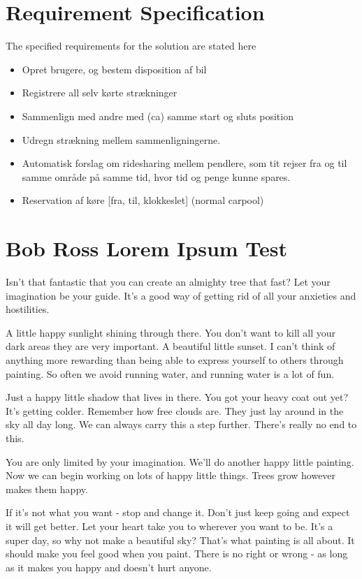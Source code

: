 \section{Requirement Specification}

The specified requirements for the solution are stated here
\begin{itemize}
	\item Opret brugere, og bestem disposition af bil
	\item Registrere all selv kørte strækninger
	\item Sammenlign med andre med (ca) samme start og sluts position
	\item Udregn strækning mellem sammenligningerne. 
	\item Automatisk forslag om ridesharing mellem pendlere, som tit rejser fra og til samme område på samme tid, hvor tid og penge kunne spares.
	\item Reservation af køre [fra, til, klokkeslet] (normal carpool)
\end{itemize}

\section{Bob Ross Lorem Ipsum Test}
Isn't that fantastic that you can create an almighty tree that fast? Let your imagination be your guide. It's a good way of getting rid of all your anxieties and hostilities.

A little happy sunlight shining through there. You don't want to kill all your dark areas they are very important. A beautiful little sunset. I can't think of anything more rewarding than being able to express yourself to others through painting. So often we avoid running water, and running water is a lot of fun.

Just a happy little shadow that lives in there. You got your heavy coat out yet? It's getting colder. Remember how free clouds are. They just lay around in the sky all day long. We can always carry this a step further. There's really no end to this.

You are only limited by your imagination. We'll do another happy little painting. Now we can begin working on lots of happy little things. Trees grow however makes them happy.

If it's not what you want - stop and change it. Don't just keep going and expect it will get better. Let your heart take you to wherever you want to be. It's a super day, so why not make a beautiful sky? That's what painting is all about. It should make you feel good when you paint. There is no right or wrong - as long as it makes you happy and doesn't hurt anyone.

